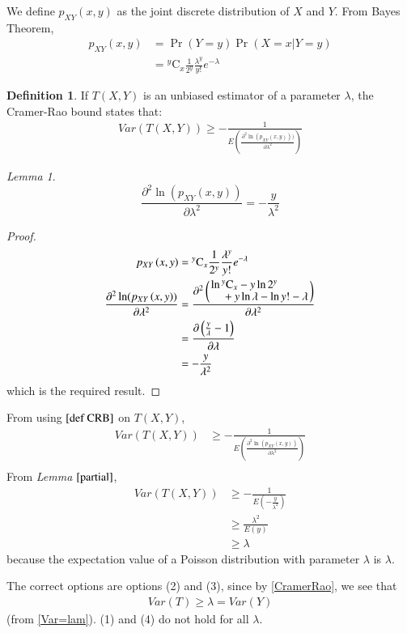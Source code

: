 \documentclass[twocolumn]{article}
\newcommand{\comb}[2]{{}^{#1}\mathrm{C}_{#2}}
\providecommand{\pr}[1]{\ensuremath{\Pr\left(#1\right)}}
\providecommand{\brak}[1]{\ensuremath{\left(#1\right)}}
\theoremstyle{remark}
\newtheorem{lemma}[theorem]{Lemma}
\theoremstyle{definition}
\newtheorem{definition}{Definition}[section]
\numberwithin{equation}{subsection}
\begin{document}
We define $ p_{XY}\brak{x, y}$ as the joint discrete distribution of $X$ and $Y$.
From Bayes Theorem,
\begin{align}
    p_{XY}\brak{x, y}&=\pr{Y=y}  \pr{X=x|Y=y}\\
    &= \comb{y}{x} \frac{1}{2^y} \frac{\lambda^y}{y!} e^{- \lambda}
\end{align}


\begin{definition} 
If $T(X, Y)$ is an unbiased estimator of a parameter $\lambda$, the Cramer-Rao bound states that:
\begin{align}
    Var\brak{T\brak{X,Y}}\geq -\frac{1}{E\brak{\frac{\partial^2 \ln(p_{XY}\brak{x, y}))}{\partial\lambda^2}}} \label{def CRB}
\end{align}
\end{definition}

\begin{lemma}\label{partial}
\begin{equation}
    \frac{\partial^2 \ln(p_{XY}\brak{x, y})}{\partial\lambda^2}=-\frac{y}{\lambda^2}
\end{equation}
\end{lemma}
\begin{proof}
\begin{align}
p_{XY}\brak{x, y}&= \comb{y}{x} \frac{1}{2^y} \frac{\lambda^y}{y!}e^{- \lambda}\\
\frac{\partial^2 \ln(p_{XY}\brak{x, y})}{\partial\lambda^2}&=\frac{\partial^2\brak{ \splitfrac{\ln{\comb{y}{x}}-y\ln{2^y}}{+y\ln{\lambda}-\ln{y!}-\lambda}}}{\partial\lambda^2}\\
&=\frac{\partial\brak{ \frac{y}{\lambda}-1}}{\partial\lambda}\\
&=-\frac{y}{\lambda^2}
\end{align}
which is the required result.
\end{proof}
From using $\eqref{def CRB}$ on $T(X,Y)$,
\begin{align}
    Var(T(X, Y))&\geq -\frac{1}{E\brak{\frac{\partial^2 \ln(p_{XY}\brak{x, y})}{\partial\lambda^2}}}\\
\end{align}
From \textit{Lemma} $\ref{partial}$,
\begin{align}
     Var(T(X, Y))&\geq-\frac{1}{E\brak{-\frac{y}{\lambda^2}}}\\
    &\geq\frac{\lambda^2}{E\brak{y}}\\
    &\geq \lambda \label{CramerRao}
\end{align}
because the expectation value of a Poisson distribution with parameter $\lambda$ is $\lambda$.

The correct options are options (2) and (3), since by \eqref{CramerRao}, we see that 
\begin{align*}
Var(T) \geq \lambda=Var(Y)
\end{align*}
(from \eqref{Var=lam}). (1) and (4) do not hold for all $\lambda$.
\end{document}
